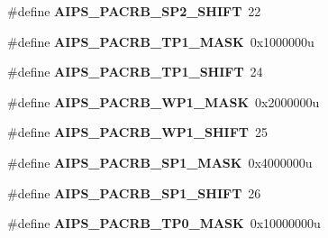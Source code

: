 \begin{DoxyCompactItemize}
\item 
\#define {\bfseries A\+I\+P\+S\+\_\+\+P\+A\+C\+R\+B\+\_\+\+S\+P2\+\_\+\+S\+H\+I\+FT}~22\hypertarget{group__AIPS__Register__Masks_gac82b74c3937dae7da06f32aecc605eff}{}\label{group__AIPS__Register__Masks_gac82b74c3937dae7da06f32aecc605eff}

\item 
\#define {\bfseries A\+I\+P\+S\+\_\+\+P\+A\+C\+R\+B\+\_\+\+T\+P1\+\_\+\+M\+A\+SK}~0x1000000u\hypertarget{group__AIPS__Register__Masks_gae937628c6d0eb166336c0f432110c118}{}\label{group__AIPS__Register__Masks_gae937628c6d0eb166336c0f432110c118}

\item 
\#define {\bfseries A\+I\+P\+S\+\_\+\+P\+A\+C\+R\+B\+\_\+\+T\+P1\+\_\+\+S\+H\+I\+FT}~24\hypertarget{group__AIPS__Register__Masks_ga48fadbc800728c286a968bdb5468ced8}{}\label{group__AIPS__Register__Masks_ga48fadbc800728c286a968bdb5468ced8}

\item 
\#define {\bfseries A\+I\+P\+S\+\_\+\+P\+A\+C\+R\+B\+\_\+\+W\+P1\+\_\+\+M\+A\+SK}~0x2000000u\hypertarget{group__AIPS__Register__Masks_gadd63112c58fb22cde7130bf7a0aec3d2}{}\label{group__AIPS__Register__Masks_gadd63112c58fb22cde7130bf7a0aec3d2}

\item 
\#define {\bfseries A\+I\+P\+S\+\_\+\+P\+A\+C\+R\+B\+\_\+\+W\+P1\+\_\+\+S\+H\+I\+FT}~25\hypertarget{group__AIPS__Register__Masks_ga3b3e2ec4b285ab5b5ce6667a05ef7ad1}{}\label{group__AIPS__Register__Masks_ga3b3e2ec4b285ab5b5ce6667a05ef7ad1}

\item 
\#define {\bfseries A\+I\+P\+S\+\_\+\+P\+A\+C\+R\+B\+\_\+\+S\+P1\+\_\+\+M\+A\+SK}~0x4000000u\hypertarget{group__AIPS__Register__Masks_gaf2eb0bc5160930c4b4e1a45f98267785}{}\label{group__AIPS__Register__Masks_gaf2eb0bc5160930c4b4e1a45f98267785}

\item 
\#define {\bfseries A\+I\+P\+S\+\_\+\+P\+A\+C\+R\+B\+\_\+\+S\+P1\+\_\+\+S\+H\+I\+FT}~26\hypertarget{group__AIPS__Register__Masks_gacd1757a9bf7adb1995c5e5ffebd7b9b8}{}\label{group__AIPS__Register__Masks_gacd1757a9bf7adb1995c5e5ffebd7b9b8}

\item 
\#define {\bfseries A\+I\+P\+S\+\_\+\+P\+A\+C\+R\+B\+\_\+\+T\+P0\+\_\+\+M\+A\+SK}~0x10000000u\hypertarget{group__AIPS__Register__Masks_ga06911e10e7c4fb7a6efe6ec5c2234521}{}\label{group__AIPS__Register__Masks_ga06911e10e7c4fb7a6efe6ec5c2234521}


\end{DoxyCompactItemize}

